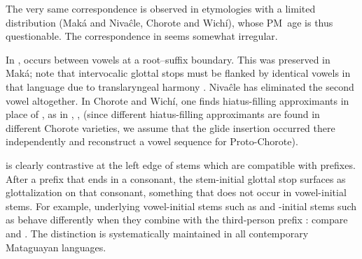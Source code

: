 \begin{exe}
    \ex \algarrobof
    \ex \dog
    \ex \woman
    \ex \iguana
    \ex \rat
    \ex \jararaca
    \ex \wildhoney
    \ex \snakeatuj
    \ex \peccary
    \ex \maguari
    \ex \mistolf
    \ex \mistolt
    \ex \chaguara
    \ex \argentineboa \label{gl-argentineboa}
    \ex \wildbean
    \ex \waspaniti
    \ex \widower
    \ex \wildpepper
    \ex \parrot
    \ex \firei
    \ex \bro
    \ex \pigeon
    \ex \doveula
    \ex \lessergrison
\end{exe}

The very same correspondence is observed in etymologies with a limited distribution (Maká and Nivaĉle, Chorote and Wichí), whose PM~age is thus questionable. The correspondence in  seems somewhat irregular.

\begin{exe}
    \ex \ocelot \label{gl-ocelot}
    \ex \paralytic
    \ex \cebil
    \ex \aloja
    \ex \doradocw
    \ex \orphanmn
    \ex \mollef
    \ex \queenpalmf
    \ex \eel
\end{exe}

In ,  occurs between vowels at a root–suffix boundary. This was preserved in Maká; note that intervocalic glottal stops must be flanked by identical vowels in that language due to translaryngeal harmony \citep[62]{AG94}. Nivaĉle has eliminated the second vowel altogether. In Chorote and Wichí, one finds hiatus-filling approximants in place of , as in , ,  (since different hiatus-filling approximants are found in different Chorote varieties, we assume that the glide insertion occurred there independently and reconstruct a vowel sequence for  Proto-Chorote).

\begin{exe}
    \ex \full\label{hiatusappr}
\end{exe}

 is clearly contrastive at the left edge of stems which are compatible with prefixes. After a prefix that ends in a consonant, the stem-initial glottal stop surfaces as glottalization on that consonant, something that does not occur in vowel-initial stems. For example, underlying vowel-initial stems such as  and \mbox{-}initial stems such as  behave differently when they combine with the third-person prefix : compare  and . The distinction is systematically maintained in all contemporary Mataguayan languages.

